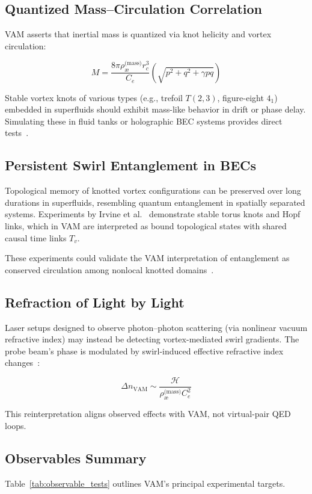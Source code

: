 \documentclass[12pt]{article}
\begin{document}
    \subsection{Quantized Mass–Circulation Correlation}
    VAM asserts that inertial mass is quantized via knot helicity and vortex circulation:

    \[
        M = \frac{8\pi \rho_{\text{\ae}}^\text{(mass)} r_c^3}{C_e} \left( \sqrt{p^2 + q^2 + \gamma pq} \right)
    \]

    Stable vortex knots of various types (e.g., trefoil \( T(2,3) \), figure-eight \( 4_1 \)) embedded in superfluids should exhibit mass-like behavior in drift or phase delay. Simulating these in fluid tanks or holographic BEC systems provides direct tests~\cite{kleckner2013creation,volovik2003universe}.

    \subsection{Persistent Swirl Entanglement in BECs}
    Topological memory of knotted vortex configurations can be preserved over long durations in superfluids, resembling quantum entanglement in spatially separated systems. Experiments by Irvine et al.~\cite{kleckner2013creation} demonstrate stable torus knots and Hopf links, which in VAM are interpreted as bound topological states with shared causal time links $T_v$.

    These experiments could validate the VAM interpretation of entanglement as conserved circulation among nonlocal knotted domains~\cite{volovik2003universe,kiehn2005torsion}.

    \subsection{Refraction of Light by Light}
    Laser setups designed to observe photon–photon scattering (via nonlinear vacuum refractive index) may instead be detecting vortex-mediated swirl gradients. The probe beam’s phase is modulated by swirl-induced effective refractive index changes~\cite{sarazin2016refraction}:

    \[
        \Delta n_{\text{VAM}} \sim \frac{\mathcal{H}}{\rho_{\text{\ae}}^{\text{(mass)}} C_e^2}
    \]

    This reinterpretation aligns observed effects with VAM, not virtual-pair QED loops.

    \subsection{Observables Summary}
    Table~\ref{tab:observable_tests} outlines VAM’s principal experimental targets.
\end{document}
